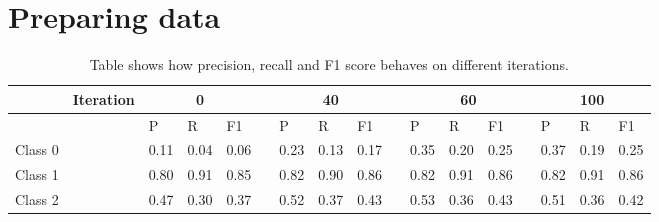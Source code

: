 \documentclass[10pt, a4paper]{article}
\begin{document}
\section{Preparing data}
\begin{table}[t!]
	\centering
	\caption{Table shows how precision, recall and F1 score behaves on different iterations.}
	\label{tbl:Scores}
	\begin{tabular}{lllllllllllllllll}
		\hline
		& Iteration             & \multicolumn{3}{c}{0}                                                             &                       & \multicolumn{3}{c}{40}                                                            &                       & \multicolumn{4}{c}{60}                                                                                    & \multicolumn{3}{c}{100} \\ \hline
		\multicolumn{1}{l}{}  & \multicolumn{1}{l}{} & \multicolumn{1}{l}{P}    & \multicolumn{1}{l}{R}    & \multicolumn{1}{l}{F1}   & \multicolumn{1}{l}{} & \multicolumn{1}{l}{P}    & \multicolumn{1}{l}{R}    & \multicolumn{1}{l}{F1}   & \multicolumn{1}{l}{} & \multicolumn{1}{l}{P}    & \multicolumn{1}{l}{R}    & \multicolumn{1}{l}{F1}   & \multicolumn{1}{l}{} & P      & R      & F1     \\ \hline
		\multicolumn{1}{l}{Class 0} & \multicolumn{1}{l}{} & \multicolumn{1}{l}{0.11} & \multicolumn{1}{l}{0.04} & \multicolumn{1}{l}{0.06} & \multicolumn{1}{l}{} & \multicolumn{1}{l}{0.23} & \multicolumn{1}{l}{0.13} & \multicolumn{1}{l}{0.17} & \multicolumn{1}{l}{} & \multicolumn{1}{l}{0.35} & \multicolumn{1}{l}{0.20} & \multicolumn{1}{l}{0.25} & \multicolumn{1}{l}{} & 0.37   & 0.19   & 0.25   \\ \hline
		\multicolumn{1}{l}{Class 1} & \multicolumn{1}{l}{} & \multicolumn{1}{l}{0.80} & \multicolumn{1}{l}{0.91} & \multicolumn{1}{l}{0.85} & \multicolumn{1}{l}{} & \multicolumn{1}{l}{0.82} & \multicolumn{1}{l}{0.90} & \multicolumn{1}{l}{0.86} & \multicolumn{1}{l}{} & \multicolumn{1}{l}{0.82} & \multicolumn{1}{l}{0.91} & \multicolumn{1}{l}{0.86} & \multicolumn{1}{l}{} & 0.82   & 0.91   & 0.86   \\ \hline
		\multicolumn{1}{l}{Class 2} & \multicolumn{1}{l}{} & \multicolumn{1}{l}{0.47} & \multicolumn{1}{l}{0.30} & \multicolumn{1}{l}{0.37} & \multicolumn{1}{l}{} & \multicolumn{1}{l}{0.52} & \multicolumn{1}{l}{0.37} & \multicolumn{1}{l}{0.43} & \multicolumn{1}{l}{} & \multicolumn{1}{l}{0.53} & \multicolumn{1}{l}{0.36} & \multicolumn{1}{l}{0.43} & \multicolumn{1}{l}{} & 0.51   & 0.36   & 0.42   \\ \hline
	\end{tabular}
\end{table}
\end{document}
